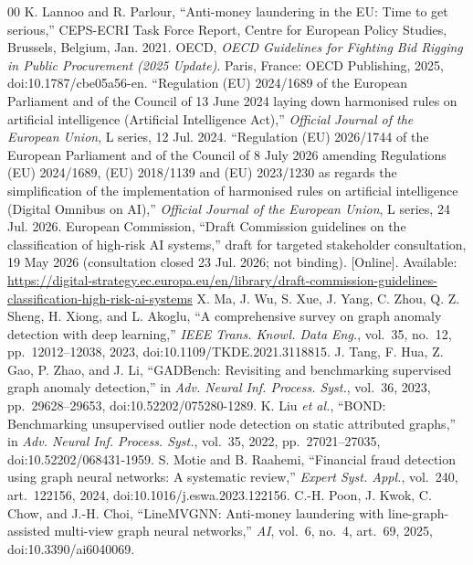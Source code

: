 \documentclass[conference]{IEEEtran}
\begin{document}
\begin{thebibliography}{00}
 K. Lannoo and R. Parlour, ``Anti-money laundering in the EU: Time to get serious,'' CEPS-ECRI Task Force Report, Centre for European Policy Studies, Brussels, Belgium, Jan. 2021.
 OECD, \emph{OECD Guidelines for Fighting Bid Rigging in Public Procurement (2025 Update)}. Paris, France: OECD Publishing, 2025, doi:10.1787/cbe05a56-en.
 ``Regulation (EU) 2024/1689 of the European Parliament and of the Council of 13 June 2024 laying down harmonised rules on artificial intelligence (Artificial Intelligence Act),'' \emph{Official Journal of the European Union}, L series, 12 Jul. 2024.
 ``Regulation (EU) 2026/1744 of the European Parliament and of the Council of 8 July 2026 amending Regulations (EU) 2024/1689, (EU) 2018/1139 and (EU) 2023/1230 as regards the simplification of the implementation of harmonised rules on artificial intelligence (Digital Omnibus on AI),'' \emph{Official Journal of the European Union}, L series, 24 Jul. 2026.
 European Commission, ``Draft Commission guidelines on the classification of high-risk AI systems,'' draft for targeted stakeholder consultation, 19 May 2026 (consultation closed 23 Jul. 2026; not binding). [Online]. Available: \url{https://digital-strategy.ec.europa.eu/en/library/draft-commission-guidelines-classification-high-risk-ai-systems}
 X. Ma, J. Wu, S. Xue, J. Yang, C. Zhou, Q. Z. Sheng, H. Xiong, and L. Akoglu, ``A comprehensive survey on graph anomaly detection with deep learning,'' \emph{IEEE Trans. Knowl. Data Eng.}, vol.~35, no.~12, pp.~12012--12038, 2023, doi:10.1109/TKDE.2021.3118815.
 J. Tang, F. Hua, Z. Gao, P. Zhao, and J. Li, ``GADBench: Revisiting and benchmarking supervised graph anomaly detection,'' in \emph{Adv. Neural Inf. Process. Syst.}, vol.~36, 2023, pp.~29628--29653, doi:10.52202/075280-1289.
 K. Liu \emph{et al.}, ``BOND: Benchmarking unsupervised outlier node detection on static attributed graphs,'' in \emph{Adv. Neural Inf. Process. Syst.}, vol.~35, 2022, pp.~27021--27035, doi:10.52202/068431-1959.
 S. Motie and B. Raahemi, ``Financial fraud detection using graph neural networks: A systematic review,'' \emph{Expert Syst. Appl.}, vol.~240, art.~122156, 2024, doi:10.1016/j.eswa.2023.122156.
 C.-H. Poon, J. Kwok, C. Chow, and J.-H. Choi, ``LineMVGNN: Anti-money laundering with line-graph-assisted multi-view graph neural networks,'' \emph{AI}, vol.~6, no.~4, art.~69, 2025, doi:10.3390/ai6040069.

\end{thebibliography}
\end{document}

